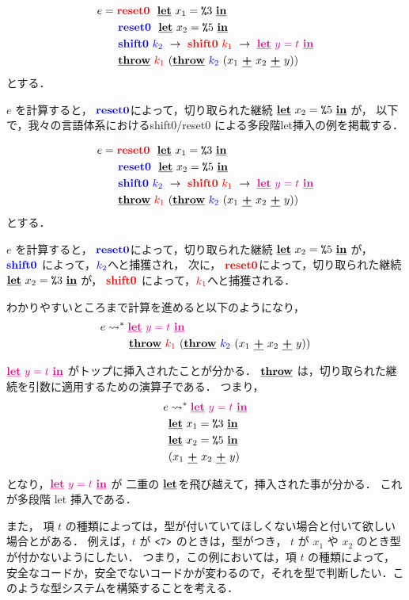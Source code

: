 \begin{align*}
    e &= \red{\Resetz} ~~\cLet~x_1=\csp{3}~\cIn \\
      &\phantom{=}~~ \blue{\Resetz} ~~\cLet~x_2=\csp{5}~\cIn \\
      &\phantom{=}~~ \blue{\Shiftz}~\blue{k_2}~\to~ \red{\Shiftz}~\red{k_1}~\to~ \magenta{\cLet~y=t~\cIn} \\
      &\phantom{=}~~ \cThrow~\red{k_1}~(\cThrow~\blue{k_2}~(x_1~\cPlus~x_2~\cPlus~y))
\end{align*}
とする．

$e$ を計算すると，
$\blue{\Resetz}$によって，切り取られた継続 $\cLet~x_2=\csp{5}~\cIn$ が，
以下で，我々の言語体系におけるshift0/reset0 による多段階let挿入の例を掲載する．

\begin{align*}
    e &= \red{\Resetz} ~~\cLet~x_1=\csp{3}~\cIn \\
      &\phantom{=}~~ \blue{\Resetz} ~~\cLet~x_2=\csp{5}~\cIn \\
      &\phantom{=}~~ \blue{\Shiftz}~\blue{k_2}~\to~ \red{\Shiftz}~\red{k_1}~\to~ \magenta{\cLet~y=t~\cIn} \\
      &\phantom{=}~~ \cThrow~\red{k_1}~(\cThrow~\blue{k_2}~(x_1~\cPlus~x_2~\cPlus~y))
\end{align*}
とする．

$e$ を計算すると，
$\blue{\Resetz}$によって，切り取られた継続 $\cLet~x_2=\csp{5}~\cIn$ が，
$\blue{\Shiftz}$ によって，$\blue{k_2}$へと捕獲され，
次に，
$\red{\Resetz}$によって，切り取られた継続 $\cLet~x_2=\csp{3}~\cIn$ が，
$\red{\Shiftz}$ によって，$\red{k_1}$へと捕獲される．

わかりやすいところまで計算を進めると以下のようになり，
\begin{align*}
  e & \too \magenta{\cLet~y=t~\cIn} \\
    & \phantom{\too}~~ \cThrow~\red{k_1}~(\cThrow~\blue{k_2}~(x_1~\cPlus~x_2~\cPlus~y))
\end{align*}

$\magenta{\cLet~y=t~\cIn}$ がトップに挿入されたことが分かる．
$\cThrow$ は，切り取られた継続を引数に適用するための演算子である．
つまり，
\begin{align*}
  e & \too \magenta{\cLet~y=t~\cIn} \\
    & \cLet~x_1=\csp{3}~\cIn \\
    & \cLet~x_2=\csp{5}~\cIn \\
    & (x_1~\cPlus~x_2~\cPlus~y)
\end{align*}

となり，$\magenta{\cLet~y=t~\cIn}$ が 二重の $\cLet$を飛び越えて，挿入された事が分かる．
これが多段階 let 挿入である．

また， 項 $t$ の種類によっては，型が付いていてほしくない場合と付いて欲しい場合とがある．
例えば，$t$ が $\code{7}$ のときは，型がつき，
$t$ が $x_1$ や $x_2$ のとき型が付かないようにしたい．
つまり，この例においては，項 $t$ の種類によって，安全なコードか，安全でないコードかが変わるので，それを型で判断したい．このような型システムを構築することを考える．

